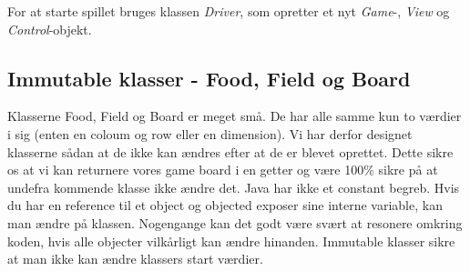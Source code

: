 For at starte spillet bruges klassen \textit{Driver}, som opretter et nyt \textit{Game}-, \textit{View} og \textit{Control}-objekt.

\subsection*{Immutable klasser - Food, Field og Board}
Klasserne Food, Field og Board er meget små. De har alle samme kun to værdier i sig (enten en coloum og row eller en dimension). Vi har derfor designet klasserne sådan at de ikke kan ændres efter at de er blevet oprettet. Dette sikre os at vi kan returnere vores game board i en getter og være 100\% sikre på at undefra kommende klasse ikke ændre det. Java har ikke et constant begreb. Hvis du har en reference til et object og objected exposer sine interne variable,  kan man ændre på klassen. Nogengange kan det godt være svært at resonere omkring koden, hvis alle objecter vilkårligt kan ændre hinanden. Immutable klasser sikre at man ikke kan ændre klassers start værdier.